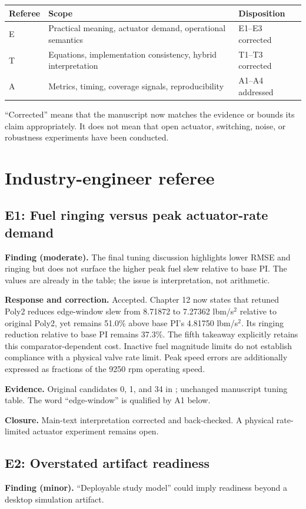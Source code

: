 \documentclass[11pt,a4paper]{article}
\newcommand{\finding}[2]{\subsection*{#1: #2}}
\begin{document}
\begin{tabular}{@{}p{.13\linewidth}p{.52\linewidth}p{.27\linewidth}@{}}\toprule
Referee & Scope & Disposition\\\midrule
E & Practical meaning, actuator demand, operational semantics & E1--E3 corrected\\
T & Equations, implementation consistency, hybrid interpretation & T1--T3 corrected\\
A & Metrics, timing, coverage signals, reproducibility & A1--A4 addressed\\\bottomrule
\end{tabular}

``Corrected'' means that the manuscript now matches the evidence or bounds its claim appropriately. It does not mean that open actuator, switching, noise, or robustness experiments have been conducted.

\clearpage
\section*{Industry-engineer referee}
\finding{E1}{Fuel ringing versus peak actuator-rate demand}
\textbf{Finding (moderate).} The final tuning discussion highlights lower RMSE and ringing but does not surface the higher peak fuel slew relative to base PI. The values are already in the table; the issue is interpretation, not arithmetic.

\textbf{Response and correction.} Accepted. Chapter 12 now states that retuned Poly2 reduces edge-window slew from 8.71872 to 7.27362 lbm/s$^2$ relative to original Poly2, yet remains 51.0\% above base PI's 4.81750 lbm/s$^2$. Its ringing reduction relative to base PI remains 37.3\%. The fifth takeaway explicitly retains this comparator-dependent cost. Inactive fuel magnitude limits do not establish compliance with a physical valve rate limit. Peak speed errors are additionally expressed as fractions of the 9250 rpm operating speed.

\textbf{Evidence.} Original candidates 0, 1, and 34 in ; unchanged manuscript tuning table. The word ``edge-window'' is qualified by A1 below.

\textbf{Closure.} Main-text interpretation corrected and back-checked. A physical rate-limited actuator experiment remains open.

\finding{E2}{Overstated artifact readiness}
\textbf{Finding (minor).} ``Deployable study model'' could imply readiness beyond a desktop simulation artifact.
\end{document}
